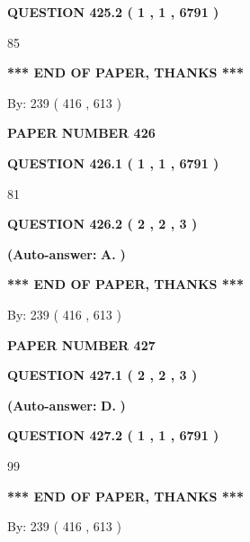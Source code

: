 \documentclass[12pt]{article}
\begin{document}
  
{\textbf{\large{QUESTION
425.2 
 ( 1 , 1 , 6791 )
}}}

85
   
   
   
   
\vspace{1.0in} 
{\textbf{\large{ *** END OF PAPER, THANKS *** }}} 
   
   
\hspace{1.0in} By: 
 239 ( 416 ,  613 )
   
   
   
   
\newpage 
\setcounter{page}{ 
   426001 } 
   
   
 {\textbf{ \Large{ PAPER NUMBER  426  }}}
   
   
   
   
  
  
{\textbf{\large{QUESTION
426.1 
 ( 1 , 1 , 6791 )
}}}

81
  
  
{\textbf{\large{QUESTION
426.2 
 ( 2 , 2 , 3 )
}}}
 
 
{\textbf{(Auto-answer:}}
{\textbf{\large{
A.}}}
{\textbf{)}}
 
 
   
   
   
   
\vspace{1.0in} 
{\textbf{\large{ *** END OF PAPER, THANKS *** }}} 
   
   
\hspace{1.0in} By: 
 239 ( 416 ,  613 )
   
   
   
   
\newpage 
\setcounter{page}{ 
   427001 } 
   
   
 {\textbf{ \Large{ PAPER NUMBER  427  }}}
   
   
   
   
  
  
{\textbf{\large{QUESTION
427.1 
 ( 2 , 2 , 3 )
}}}
 
 
{\textbf{(Auto-answer:}}
{\textbf{\large{
D.}}}
{\textbf{)}}
 
 
  
  
{\textbf{\large{QUESTION
427.2 
 ( 1 , 1 , 6791 )
}}}

99
   
   
   
   
\vspace{1.0in} 
{\textbf{\large{ *** END OF PAPER, THANKS *** }}} 
   
   
\hspace{1.0in} By: 
 239 ( 416 ,  613 )
   
   
   
\end{document}
